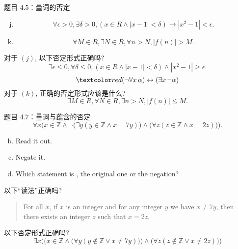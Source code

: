 \begin{frame}{}
  \begin{exampleblock}{题目 4.5：量词的否定}
    \begin{enumerate}[(a)]
      \setcounter{enumi}{9}
      \item 
	\[
	  \forall \epsilon > 0, \exists \delta > 0, (x \in R \land |x - 1| < \delta) \to |x^2 - 1| < \epsilon.
	\]
      \item
	\[
	  \forall M \in R, \exists N \in R, \forall n > N, |f(n)| > M.
	\]
    \end{enumerate}
  \end{exampleblock}

  \vspace{0.50cm}
  \pause
  对于 $(j)$, 以下否定形式正确吗?
  \[
    \exists \epsilon \le 0, \forall \delta \le 0, (x \in R \land |x - 1| < \delta) \land |x^2 - 1| \ge \epsilon.
  \]
  \pause
  \vspace{-0.30cm}
  \[
    \red{(\lnot \forall x\, \alpha) \leftrightarrow (\exists x\, \lnot \alpha)}
  \]
  \pause
  对于 $(k)$, 正确的否定形式应该是什么?
  \[
    \exists M \in R, \forall N \in R, \exists n > N, |f(n)| \le M.
  \]
\end{frame}

\begin{frame}{}
  \begin{exampleblock}{题目 4.7：量词与蕴含的否定}
    \[
      \forall x \Big(x \in \mathbb{Z} \land \lnot\big(\exists y (y \in \mathbb{Z} \land x = 7y)\big)
	\land \big(\forall z (z \in \mathbb{Z} \land x = 2z)\big)\Big).
    \]
    \vspace{-0.60cm}
    \begin{enumerate}[(a)]
      \setcounter{enumi}{1}
        \item Read it out.
      \setcounter{enumi}{0}
        \item Negate it.
      \setcounter{enumi}{2}
	\item Which statement is , the original one or the negation?
    \end{enumerate}
  \end{exampleblock}

  \pause
  \vspace{0.50cm}
  以下``读法''正确吗?
  \begin{quote}
    For all $x$, if $x$ is an integer and for any integer $y$ we have $x \neq 7y$,
    then there exists an integer $z$ such that $x = 2z$.
  \end{quote}

  \pause
  以下否定形式正确吗?
  \[
    \exists x \Big( \big(x \in \mathbb{Z} \land \big(\forall y (y \notin \mathbb{Z} \lor x \neq 7y)\big) \big) 
    \land \big(\forall z (z \notin \mathbb{Z} \lor x \neq 2z) \big) \Big)
  \]
\end{frame}

